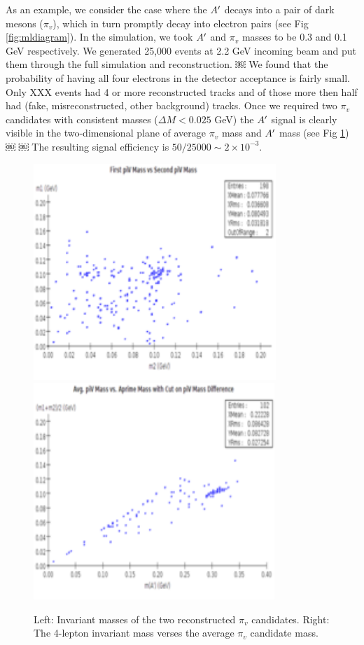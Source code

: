 As an example, we consider the case where the $A^\prime$ decays into a pair of dark mesons ($\pi_v$), which in turn promptly decay into electron pairs (see Fig \ref{fig:mldiagram}). In the simulation, we took $A^\prime$ and $\pi_v$ masses to be 0.3 and 0.1 GeV respectively. We generated 25,000 events at 2.2 GeV incoming beam and put them through the full simulation and reconstruction.
￼
We found that the probability of having all four electrons in the detector acceptance is fairly small. Only XXX events had 4 or more reconstructed tracks and of those more then half had (fake, misreconstructed, other background) tracks. Once we required two $\pi_v$ candidates with consistent masses ($\Delta M<0.025$ GeV) the $A^\prime$ signal is clearly visible in the two-dimensional plane of average $\pi_v$ mass and $A^\prime$ mass (see Fig \ref{fig:mlinvmass}) ￼    ￼
The resulting signal efficiency is $50/25000 \sim 2\times 10^{-3}$.


\begin{figure}
\includegraphics[scale=1]{measurements/ML-m1vsm2pdf.pdf}
\includegraphics[scale=1]{measurements/ML-mAvsmAvgf.pdf}
\caption{Left:  Invariant masses of the two reconstructed $\pi_v$ candidates.  Right:  The 4-lepton invariant mass verses the average  $\pi_v$ candidate mass.}
\label{fig:mlinvmass}
\end{figure}
 
